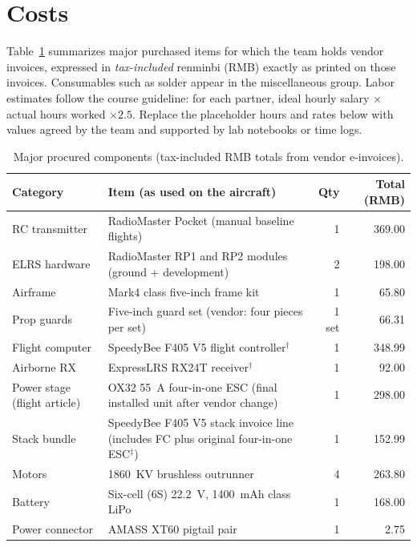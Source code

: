 \section{Costs}

Table~\ref{tab:bom-major} summarizes major purchased items for which the team holds vendor
invoices, expressed in \emph{tax-included} renminbi (RMB) exactly as printed on those invoices.
Consumables such as solder appear in the miscellaneous group.
Labor estimates follow the course guideline: for each partner, ideal hourly salary $\times$ actual
hours worked $\times 2.5$.
Replace the placeholder hours and rates below with values agreed by the team and supported by
lab notebooks or time logs.

\begin{table}[htb!]
    \centering
    \caption{Major procured components (tax-included RMB totals from vendor e-invoices).}
    \label{tab:bom-major}
    \begin{tabularx}{\linewidth}{l X r r}
        \hline
        \textbf{Category} & \textbf{Item (as used on the aircraft)} &
            \textbf{Qty} & \textbf{Total (RMB)} \\
        \hline
        RC transmitter & RadioMaster Pocket (manual baseline flights) & 1 & 369.00 \\
        ELRS hardware   & RadioMaster RP1 and RP2 modules (ground + development) & 2 & 198.00 \\
        Airframe        & Mark4 class five-inch frame kit & 1 & 65.80 \\
        Prop guards     & Five-inch guard set (vendor: four pieces per set) & 1 set & 66.31 \\
        Flight computer & SpeedyBee F405 V5 flight controller$^{\dagger}$ & 1 & 348.99 \\
        Airborne RX     & ExpressLRS RX24T receiver$^{\dagger}$ & 1 & 92.00 \\
        Power stage (flight article) &
            OX32 55~A four-in-one ESC (final installed unit after vendor change) & 1 & 298.00 \\
        Stack bundle    &
            SpeedyBee F405 V5 stack invoice line (includes FC plus original four-in-one
            ESC$^{\ddagger}$) & 1 & 152.99 \\
        Motors          & 1860~KV brushless outrunner & 4 & 263.80 \\
        Battery         & Six-cell (6S) 22.2~V, 1400~mAh class LiPo & 1 & 168.00 \\
        Power connector & AMASS XT60 pigtail pair & 1 & 2.75 \\

\end{tabularx}
\end{table}
